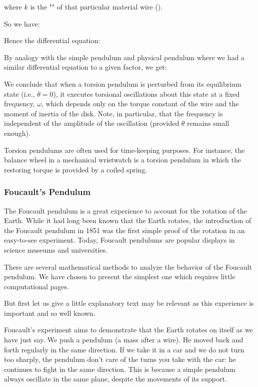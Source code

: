 	where $k$ is the "" of that particular material wire ().

	So we have:
	
	Hence the differential equation:
	
	By analogy with the simple pendulum and physical pendulum where we had a similar differential equation to a given factor, we get:
	
	We conclude that when a torsion pendulum is perturbed from its equilibrium state (i.e., $\theta=0$), it executes torsional oscillations about this state at a fixed frequency, $\omega$, which depends only on the torque constant of the wire and the moment of inertia of the disk. Note, in particular, that the frequency is independent of the amplitude of the oscillation (provided $\theta$ remains small enough). 

	Torsion pendulums are often used for time-keeping purposes. For instance, the balance wheel in a mechanical wristwatch is a torsion pendulum in which the restoring torque is provided by a coiled spring.
	
	\subsubsection{Foucault's Pendulum}
	The Foucault pendulum is a great experience to account for the rotation of the Earth.  While it had long been known that the Earth rotates, the introduction of the Foucault pendulum in 1851 was the first simple proof of the rotation in an easy-to-see experiment. Today, Foucault pendulums are popular displays in science museums and universities.

	There are several mathematical methods to analyze the behavior of the Foucault pendulum. We have chosen to present the simplest one which requires little computational pages.

	But first let us give a little explanatory text may be relevant as this experience is important and so well known.

	Foucault's experiment aims to demonstrate that the Earth rotates on itself as we have just say. We push a pendulum (a mass after a wire). He moved back and forth regularly in the same direction. If we take it in a car and we do not turn too sharply, the pendulum don't care of the turns you take with the car: he continues to fight in the same direction. This is because a simple pendulum always oscillate in the same plane, despite the movements of its support.

